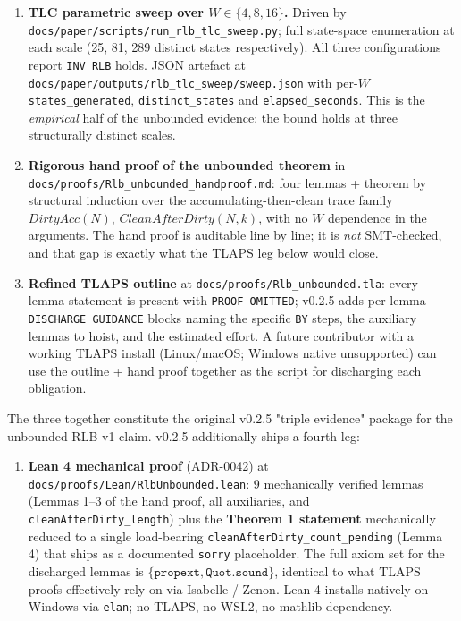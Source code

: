 \documentclass[11pt,a4paper]{article}
\begin{document}
\begin{enumerate}[noitemsep,topsep=2pt]
  \item \textbf{TLC parametric sweep over $W \in \{4, 8, 16\}$.}
        Driven by
        \texttt{docs/paper/scripts/run\_rlb\_tlc\_sweep.py}; full
        state-space enumeration at each scale (25, 81, 289
        distinct states respectively). All three configurations
        report \texttt{INV\_RLB} holds. JSON artefact at
        \texttt{docs/paper/outputs/rlb\_tlc\_sweep/sweep.json}
        with per-$W$ \texttt{states\_generated},
        \texttt{distinct\_states} and \texttt{elapsed\_seconds}.
        This is the \emph{empirical} half of the unbounded
        evidence: the bound holds at three structurally distinct
        scales.
  \item \textbf{Rigorous hand proof of the unbounded theorem}
        in
        \texttt{docs/proofs/Rlb\_unbounded\_handproof.md}: four
        lemmas + theorem by structural induction over the
        accumulating-then-clean trace family
        $\mathit{DirtyAcc}(N)$, $\mathit{CleanAfterDirty}(N, k)$,
        with no $W$ dependence in the arguments. The hand proof
        is auditable line by line; it is \emph{not} SMT-checked,
        and that gap is exactly what the TLAPS leg below would
        close.
  \item \textbf{Refined TLAPS outline} at
        \texttt{docs/proofs/Rlb\_unbounded.tla}: every lemma
        statement is present with \texttt{PROOF OMITTED};
        v0.2.5 adds per-lemma \texttt{DISCHARGE GUIDANCE}
        blocks naming the specific \texttt{BY} steps, the
        auxiliary lemmas to hoist, and the estimated effort.
        A future contributor with a working TLAPS install
        (Linux/macOS; Windows native unsupported) can use the
        outline + hand proof together as the script for
        discharging each obligation.
\end{enumerate}

The three together constitute the original v0.2.5 "triple
evidence" package for the unbounded RLB-v1 claim. v0.2.5
additionally ships a fourth leg:

\begin{enumerate}[noitemsep,topsep=2pt,start=4]
  \item \textbf{Lean 4 mechanical proof} (ADR-0042) at
        \texttt{docs/proofs/Lean/RlbUnbounded.lean}: 9
        mechanically verified lemmas (Lemmas 1--3 of the hand
        proof, all auxiliaries, and \texttt{cleanAfterDirty\_length})
        plus the \textbf{Theorem 1 statement} mechanically
        reduced to a single load-bearing
        \texttt{cleanAfterDirty\_count\_pending} (Lemma 4) that
        ships as a documented \texttt{sorry} placeholder. The
        full axiom set for the discharged lemmas is
        $\{\texttt{propext}, \texttt{Quot.sound}\}$, identical to
        what TLAPS proofs effectively rely on via Isabelle / Zenon.
        Lean 4 installs natively on Windows via \texttt{elan}; no
        TLAPS, no WSL2, no mathlib dependency.
\end{enumerate}
\end{document}
